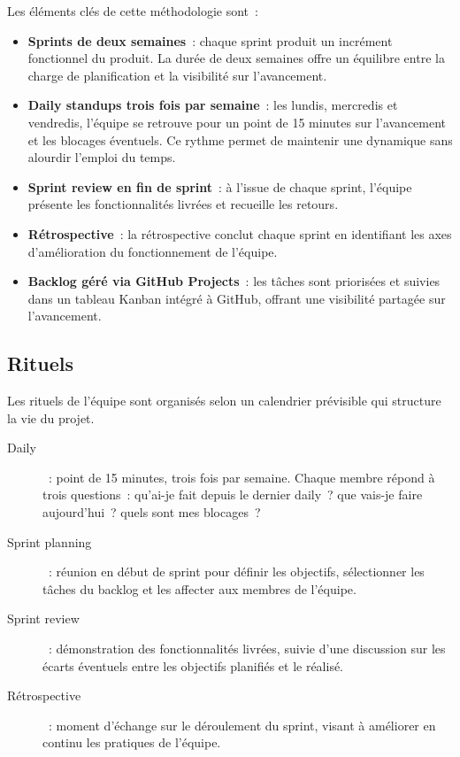 Les \'el\'ements cl\'es de cette m\'ethodologie sont~:

\begin{itemize}
  \item \textbf{Sprints de deux semaines}~: chaque sprint produit un
    incr\'ement fonctionnel du produit. La dur\'ee de deux semaines
    offre un \'equilibre entre la charge de planification et la
    visibilit\'e sur l'avancement.
  \item \textbf{Daily standups trois fois par semaine}~: les lundis,
    mercredis et vendredis, l'\'equipe se retrouve pour un point de 15
    minutes sur l'avancement et les blocages \'eventuels. Ce rythme
    permet de maintenir une dynamique sans alourdir l'emploi du temps.
  \item \textbf{Sprint review en fin de sprint}~: \`a l'issue de chaque
    sprint, l'\'equipe pr\'esente les fonctionnalit\'es livr\'ees et
    recueille les retours.
  \item \textbf{R\'etrospective}~: la r\'etrospective conclut chaque
    sprint en identifiant les axes d'am\'elioration du fonctionnement
    de l'\'equipe.
  \item \textbf{Backlog g\'er\'e via GitHub Projects}~: les t\^aches
    sont prioris\'ees et suivies dans un tableau Kanban int\'egr\'e \`a
    GitHub, offrant une visibilit\'e partag\'ee sur l'avancement.
\end{itemize}

\subsection{Rituels}

Les rituels de l'\'equipe sont organis\'es selon un calendrier
pr\'evisible qui structure la vie du projet.

\begin{description}
  \item[Daily]~: point de 15 minutes, trois fois par semaine. Chaque
    membre r\'epond \`a trois questions~: qu'ai-je fait depuis le
    dernier daily~? que vais-je faire aujourd'hui~? quels sont mes
    blocages~?
  \item[Sprint planning]~: r\'eunion en d\'ebut de sprint pour
    d\'efinir les objectifs, s\'electionner les t\^aches du backlog et
    les affecter aux membres de l'\'equipe.
  \item[Sprint review]~: d\'emonstration des fonctionnalit\'es
    livr\'ees, suivie d'une discussion sur les \'ecarts \'eventuels
    entre les objectifs planifi\'es et le r\'ealis\'e.
  \item[R\'etrospective]~: moment d'\'echange sur le d\'eroulement du
    sprint, visant \`a am\'eliorer en continu les pratiques de
    l'\'equipe.
\end{description}

